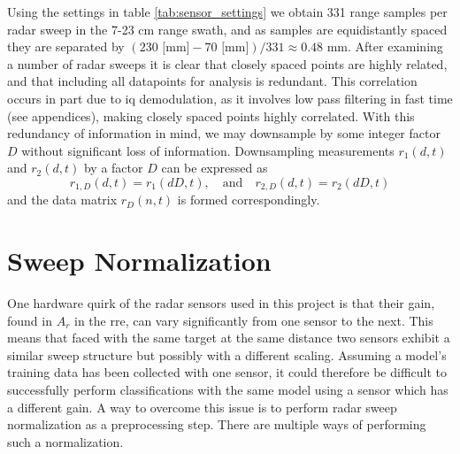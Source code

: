 
Using the settings in table \ref{tab:sensor_settings} we obtain 331 range samples per radar sweep in the 7-23 cm range swath, and as samples are equidistantly spaced they are separated by $(230 \text{ [mm]}-70\text{ [mm]})/331\approx0.48$ mm. After examining a number of radar sweeps it is clear that closely spaced points are highly related, and that including all datapoints for analysis is redundant. This correlation occurs in part due to \gls{iq} demodulation, as it involves low pass filtering in fast time (see appendices), making closely spaced points highly correlated. With this redundancy of information in mind, we may downsample by some integer factor $D$ without significant loss of information. Downsampling measurements $r_1(d,t)$ and $r_2(d,t)$ by a factor $D$ can be expressed as
\begin{equation}
	\label{eq:downsamp}
	r_{1,D}(d, t) = r_{1}(dD,t),
	\quad \text{and} \quad r_{2,D}(d,t) = r_{2}(dD,t)
\end{equation}
and the data matrix $r_D(n,t)$ is formed correspondingly.

\section{Sweep Normalization}\label{sec:norm}

One hardware quirk of the radar sensors used in this project is that their gain, found in $A_r$ in the \gls{rre}, can vary significantly from one sensor to the next. This means that faced with the same target at the same distance two sensors exhibit a similar sweep structure but possibly with a different scaling. Assuming a model's training data has been collected with one sensor, it could therefore be difficult to successfully perform classifications with the same model using a sensor which has a different gain. A way to overcome this issue is to perform radar sweep normalization as a preprocessing step. There are multiple ways of performing such a normalization. %

